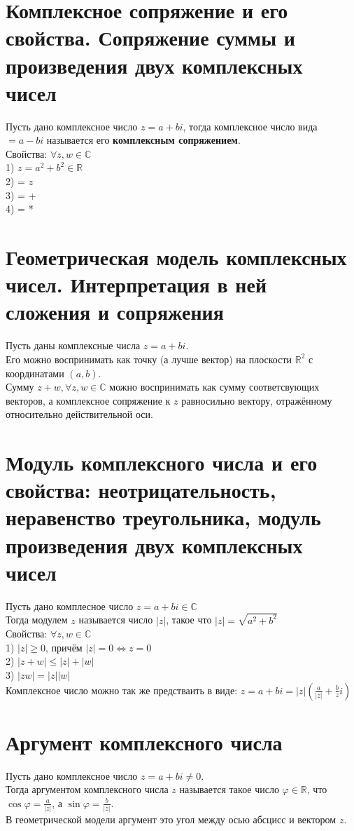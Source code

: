 \documentclass[a4paper,11pt]{report}
\begin{document}
\section{Комплексное сопряжение и его свойства. Сопряжение суммы и произведения двух комплексных чисел}
Пусть дано комплексное число $z = a + bi$, тогда комплексное число вида $ = a - bi$ 
называется его \textbf{комплексным сопряжением}.\\
Свойства: $\forall z, w \in \mathbb{C}$\\
1) $z$$ = a^2 + b^2 \in \mathbb{R}$\\
2)  = $z$\\
3)  =  + \\
4)  =  * \\
\section{Геометрическая модель комплексных чисел. Интерпретация в ней сложения и сопряжения}
Пусть даны комплексные числа $z = a + bi$.\\
Его можно воспринимать как точку (а лучше вектор) на плоскости $\mathbb{R}^2$ с координатами $(a, b)$.\\
Сумму $z + w, \forall z, w \in \mathbb{C}$ можно воспринимать как сумму соответсвующих векторов, а
комплексное сопряжение к $z$ равносильно вектору, отражённому относительно действительной оси.
\section{Модуль комплексного числа и его свойства: неотрицательность, неравенство треугольника, модуль произведения
	      двух комплексных чисел}
Пусть дано комплесное число $z = a + bi \in \mathbb{C}$\\
Тогда модулем $z$ называется число $|z|$, такое что $|z| = \sqrt{a^2 + b^2}$\\
Свойства: $\forall z, w \in \mathbb{C}$\\
1) $|z| \geqslant 0$, причём $|z| = 0 \Leftrightarrow z = 0$\\
2) $|z + w| \leqslant |z| + |w|$\\
3) $|zw| = |z||w|$\\
Комплексное число можно так же предстваить в виде: $z = a + bi = |z|(\frac{a}{|z|} + \frac{b}{z}i)$\\
\section{Аргумент комплексного числа}
Пусть дано комплексное число $z = a + bi \neq 0$.\\
Тогда аргументом комплексного числа $z$ называется такое число $\varphi \in \mathbb{R}$, что
$\cos{\varphi} = \frac{a}{|z|}$, а $\sin{\varphi} = \frac{b}{|z|}$.\\
В геометрической модели аргумент это угол между осью абсцисс и вектором $z$.
\end{document}
